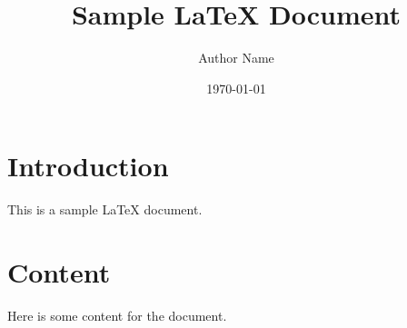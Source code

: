 \documentclass{article}
\begin{document}
\title{Sample LaTeX Document}
\author{Author Name}
\date{\today}
\maketitle

\section{Introduction}
This is a sample LaTeX document.

\section{Content}
Here is some content for the document.
\end{document}
